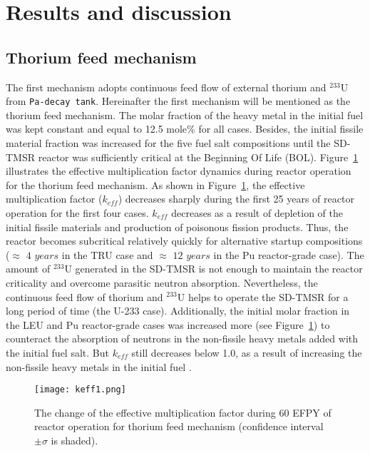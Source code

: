 \section{Results and discussion} \label{Results-and-discussion}

\subsection{Thorium feed mechanism}

The first mechanism adopts continuous feed flow of external thorium and 
$^{233}$U from \texttt{Pa-decay tank}. Hereinafter the first mechanism will be 
mentioned as the thorium feed mechanism. The molar fraction of the heavy metal 
in the initial fuel was kept constant and equal to 12.5 mole\% for all cases. 
Besides, the initial fissile material fraction was increased for the five fuel 
salt compositions until the \gls{SD-TMSR} reactor was sufficiently critical at 
the Beginning Of Life (BOL). 
Figure~\ref{fig:keff1} illustrates the effective multiplication factor 
dynamics during reactor operation for the thorium feed mechanism. As shown in 
Figure~\ref{fig:keff1}, the effective multiplication factor ($k_{eff}$) 
decreases sharply during the first 25 years of reactor operation for the first 
four cases. $k_{eff}$ decreases as a result of depletion of the initial 
fissile materials and production of poisonous fission products. Thus, the 
reactor becomes subcritical relatively quickly for alternative startup 
compositions ($\approx$ $4$ $years$ in the \gls{TRU} case and $\approx$ $12$ 
$years$ in the Pu reactor-grade case). The amount of $^{233}$U generated in 
the \gls{SD-TMSR} is not enough to maintain the reactor criticality and 
overcome parasitic neutron absorption. Nevertheless, 
the continuous feed flow of thorium and $^{233}$U helps to operate the 
\gls{SD-TMSR} for a long period of time (the U-233 case). Additionally, the 
initial molar fraction in the LEU and Pu reactor-grade cases was increased 
more (see Figure~\ref{fig:keff1}) to counteract the absorption of neutrons in 
the non-fissile heavy metals added with the initial fuel salt. But $k_{eff}$ 
still decreases below 1.0, as a result of increasing the non-fissile heavy 
metals in the initial fuel \cite{betzler2016modeling}.
\begin{figure}
	\centering
	\texttt{[image: keff1.png]}
		\vspace{-0.5in}
	\caption{The change of the effective multiplication factor during 60 \gls{EFPY} of reactor operation for thorium feed mechanism (confidence interval $\pm\sigma$ is shaded).} 
	\label{fig:keff1}
\end{figure}

